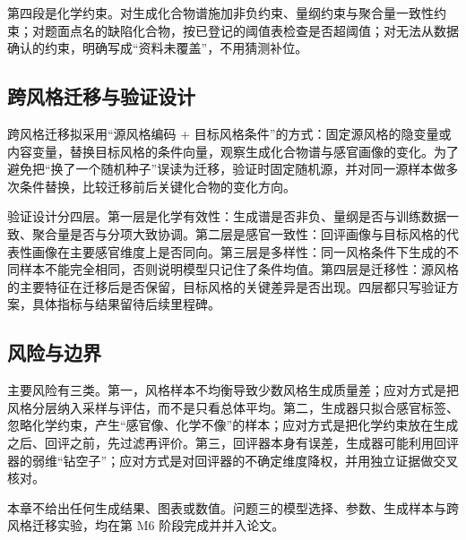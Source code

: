 第四段是化学约束。对生成化合物谱施加非负约束、量纲约束与聚合量一致性约束；对题面点名的缺陷化合物，按已登记的阈值表检查是否超阈值；对无法从数据确认的约束，明确写成“资料未覆盖”，不用猜测补位。

\subsection{跨风格迁移与验证设计}

跨风格迁移拟采用“源风格编码 + 目标风格条件”的方式：固定源风格的隐变量或内容变量，替换目标风格的条件向量，观察生成化合物谱与感官画像的变化。为了避免把“换了一个随机种子”误读为迁移，验证时固定随机源，并对同一源样本做多次条件替换，比较迁移前后关键化合物的变化方向。

验证设计分四层。第一层是化学有效性：生成谱是否非负、量纲是否与训练数据一致、聚合量是否与分项大致协调。第二层是感官一致性：回评画像与目标风格的代表性画像在主要感官维度上是否同向。第三层是多样性：同一风格条件下生成的不同样本不能完全相同，否则说明模型只记住了条件均值。第四层是迁移性：源风格的主要特征在迁移后是否保留，目标风格的关键差异是否出现。四层都只写验证方案，具体指标与结果留待后续里程碑。

\subsection{风险与边界}

主要风险有三类。第一，风格样本不均衡导致少数风格生成质量差；应对方式是把风格分层纳入采样与评估，而不是只看总体平均。第二，生成器只拟合感官标签、忽略化学约束，产生“感官像、化学不像”的样本；应对方式是把化学约束放在生成之后、回评之前，先过滤再评价。第三，回评器本身有误差，生成器可能利用回评器的弱维“钻空子”；应对方式是对回评器的不确定维度降权，并用独立证据做交叉核对。

本章不给出任何生成结果、图表或数值。问题三的模型选择、参数、生成样本与跨风格迁移实验，均在第 M6 阶段完成并并入论文。

